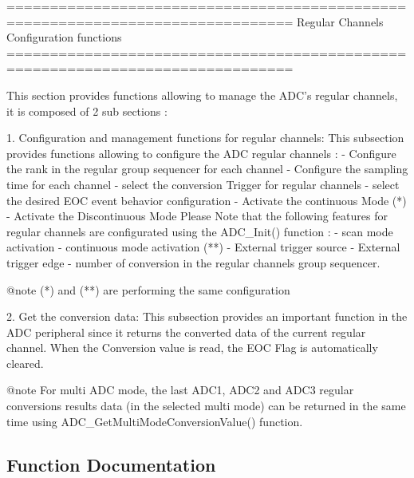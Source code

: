 \begin{DoxyVerb} ===============================================================================
                  Regular Channels Configuration functions
 ===============================================================================  

  This section provides functions allowing to manage the ADC's regular channels,
  it is composed of 2 sub sections : 
  
  1. Configuration and management functions for regular channels: This subsection 
     provides functions allowing to configure the ADC regular channels :    
          - Configure the rank in the regular group sequencer for each channel
          - Configure the sampling time for each channel
          - select the conversion Trigger for regular channels
          - select the desired EOC event behavior configuration
          - Activate the continuous Mode  (*)
          - Activate the Discontinuous Mode 
     Please Note that the following features for regular channels are configurated
     using the ADC_Init() function : 
          - scan mode activation 
          - continuous mode activation (**) 
          - External trigger source  
          - External trigger edge 
          - number of conversion in the regular channels group sequencer.
     
     @note (*) and (**) are performing the same configuration
     
  2. Get the conversion data: This subsection provides an important function in 
     the ADC peripheral since it returns the converted data of the current 
     regular channel. When the Conversion value is read, the EOC Flag is 
     automatically cleared.
     
     @note For multi ADC mode, the last ADC1, ADC2 and ADC3 regular conversions 
           results data (in the selected multi mode) can be returned in the same 
           time using ADC_GetMultiModeConversionValue() function. \end{DoxyVerb}
 

\subsection{Function Documentation}
\mbox{\label{group__ADC__Group4_ga879d70e9345d35688590938503f961db}} 
